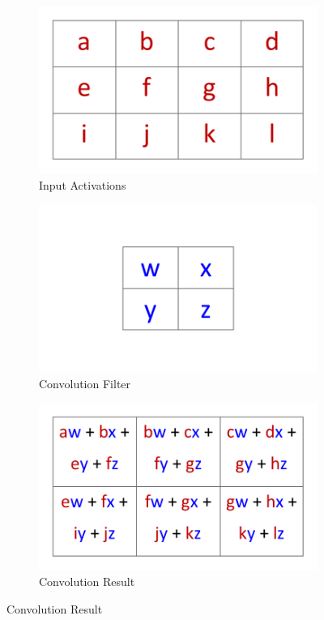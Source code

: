 \documentclass[12pt,letterpaper]{article}
\begin{document}
\begin{figure}[H]
\begin{center}

	\begin{subfigure}{0.45\textwidth}
	\includegraphics[scale=0.6]{../figures/2DConvExample(a)}
	\caption{Input Activations}
	\end{subfigure}
	
	\begin{subfigure}{0.45\textwidth}
	\includegraphics[scale=0.6]{../figures/2DConvExample(b)}
	\caption{Convolution Filter}
	\end{subfigure}
	
	\begin{subfigure}{0.9\textwidth}
	\centering
	\includegraphics[scale=0.6]{../figures/2DConvExample(c)}
	\caption{Convolution Result}
	\end{subfigure}
	

\end{center}
\end{figure}
\end{document}
